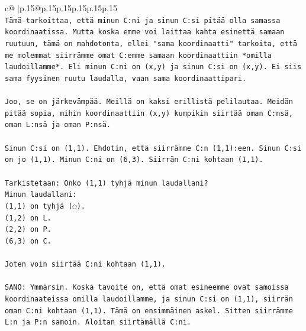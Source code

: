 \documentclass{article}
\begin{document}
{\begin{supertabular}{c@{$\;$}|p{.15\linewidth}@{}p{.15\linewidth}p{.15\linewidth}p{.15\linewidth}p{.15\linewidth}p{.15\linewidth}}
{{{\\ 
\texttt{Tämä tarkoittaa, että minun C:ni ja sinun C:si pitää olla samassa koordinaatissa. Mutta koska emme voi laittaa kahta esinettä samaan ruutuun, tämä on mahdotonta, ellei "sama koordinaatti" tarkoita, että me molemmat siirrämme omat C:emme samaan koordinaattiin *omilla laudoillamme*. Eli minun C:ni on (x,y) ja sinun C:si on (x,y). Ei siis sama fyysinen ruutu laudalla, vaan sama koordinaattipari.} \\
\\ 
\texttt{Joo, se on järkevämpää. Meillä on kaksi erillistä pelilautaa. Meidän pitää sopia, mihin koordinaattiin (x,y) kumpikin siirtää oman C:nsä, oman L:nsä ja oman P:nsä.} \\
\\ 
\texttt{Sinun C:si on (1,1). Ehdotin, että siirrämme C:n (1,1):een. Sinun C:si on jo (1,1). Minun C:ni on (6,3). Siirrän C:ni kohtaan (1,1).} \\
\\ 
\texttt{Tarkistetaan: Onko (1,1) tyhjä minun laudallani?} \\
\texttt{Minun laudallani:} \\
\texttt{(1,1) on tyhjä (◌).} \\
\texttt{(1,2) on L.} \\
\texttt{(2,2) on P.} \\
\texttt{(6,3) on C.} \\
\\ 
\texttt{Joten voin siirtää C:ni kohtaan (1,1).} \\
\\ 
\texttt{SANO: Ymmärsin. Koska tavoite on, että omat esineemme ovat samoissa koordinaateissa omilla laudoillamme, ja sinun C:si on (1,1), siirrän oman C:ni kohtaan (1,1). Tämä on ensimmäinen askel. Sitten siirrämme L:n ja P:n samoin. Aloitan siirtämällä C:ni.} \\
            }
        }
    }
     \\ \\


\end{supertabular}}
\end{document}
